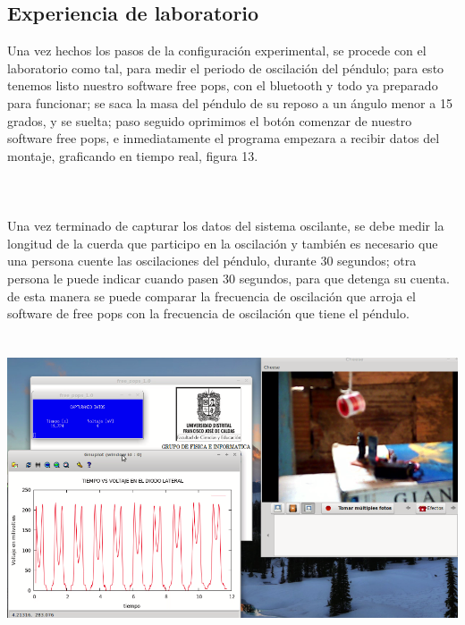 \documentclass[12pt]{article}
\newenvironment{Figure}
{\par\medskip\noindent\minipage{\linewidth}}
{\endminipage\par\medskip}
\begin{document}
\begin{multicols}{2}
\section{Experiencia de laboratorio}
Una vez hechos los pasos de la configuración experimental, se procede con el laboratorio como tal, para medir el periodo de oscilación del péndulo; para esto tenemos listo nuestro software free pops, con el bluetooth y todo ya preparado para funcionar; se saca la masa del péndulo de su reposo a un ángulo menor a 15 grados, y se suelta; paso seguido oprimimos el botón comenzar de nuestro software free pops, e inmediatamente el programa empezara a recibir datos del montaje, graficando en tiempo real, figura 13.
\\ \\ \\ \\
Una vez terminado de capturar los datos del sistema oscilante,  se debe medir la longitud de la cuerda que participo en la oscilación y también es necesario que una persona cuente las oscilaciones del péndulo, durante 30 segundos; otra persona le puede indicar cuando pasen 30 segundos, para que detenga su cuenta. de esta manera se puede comparar la frecuencia de oscilación  que arroja el software de free pops con la frecuencia de oscilación que tiene el péndulo.
\\ \\


\begin{Figure}
\center
\includegraphics[width=9.cm, height=8cm]{fig/graf1.png}
\label{fig:g13}
\end{Figure}
\vspace{0.2cm}


\end{multicols}
\end{document}
